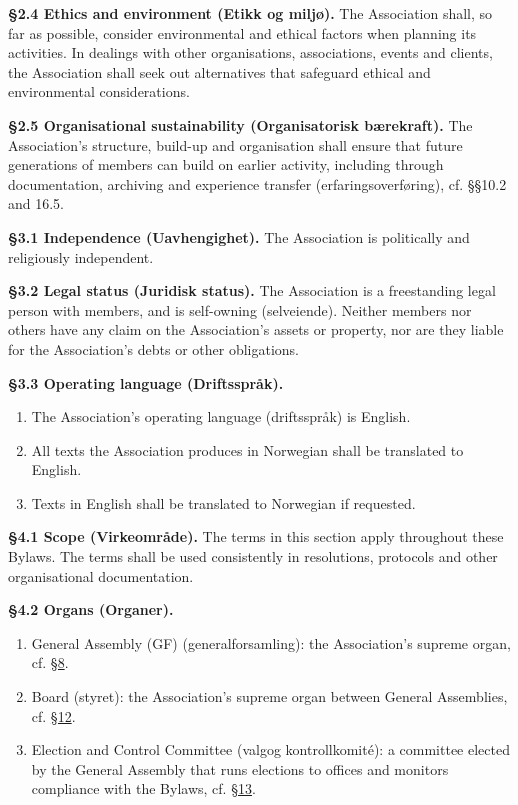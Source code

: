 \documentclass{../../../Common/Latex/Templates/rapport}
\begin{document}
\textbf{\S 2.4 Ethics and environment (Etikk og miljø).}\label{bylaw:2.4} The Association shall, so far as possible, consider environmental and ethical factors when planning its activities. In dealings with other organisations, associations, events and clients, the Association shall seek out alternatives that safeguard ethical and environmental considerations.

\textbf{\S 2.5 Organisational sustainability (Organisatorisk bærekraft).}\label{bylaw:2.5} The Association's structure, build-up and organisation shall ensure that future generations of members can build on earlier activity, including through documentation, archiving and experience transfer (erfaringsoverføring), cf. \S\S10.2 and 16.5.

\label{bylaw:3}
\textbf{\S 3.1 Independence (Uavhengighet).}\label{bylaw:3.1} The Association is politically and religiously independent.

\textbf{\S 3.2 Legal status (Juridisk status).}\label{bylaw:3.2} The Association is a freestanding legal person with members, and is self-owning (selveiende). Neither members nor others have any claim on the Association's assets or property, nor are they liable for the Association's debts or other obligations.

\textbf{\S 3.3 Operating language (Driftsspråk).}\label{bylaw:3.3}
\begin{enumerate}
  \item The Association's operating language (driftsspråk) is English.
  \item All texts the Association produces in Norwegian shall be translated to English.
  \item Texts in English shall be translated to Norwegian if requested.
\end{enumerate}

\label{bylaw:4}
\textbf{\S 4.1 Scope (Virkeområde).}\label{bylaw:4.1} The terms in this section apply throughout these Bylaws. The terms shall be used consistently in resolutions, protocols and other organisational documentation.

\textbf{\S 4.2 Organs (Organer).}\label{bylaw:4.2}
\begin{enumerate}
  \item General Assembly (GF) (generalforsamling): the Association's supreme organ, cf. \hyperref[bylaw:8]{\S 8}.
  \item Board (styret): the Association's supreme organ between General Assemblies, cf. \hyperref[bylaw:12]{\S 12}.
  \item Election and Control Committee (valgog kontrollkomité): a committee elected by the General Assembly that runs elections to offices and monitors compliance with the Bylaws, cf. \hyperref[bylaw:13]{\S 13}.
\end{enumerate}
\end{document}
